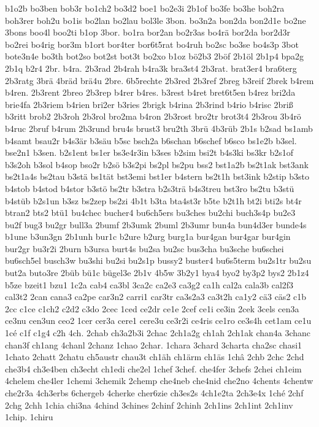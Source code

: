 {b1o2b
bo3ben
bob3r
bo1ch2
bo3d2
boe1
bo2e3i
2b1of
bo3fe
bo3he
boh2ra
boh3rer
boh2u
bo1is
bo2lan
bo2lau
bol3le
3bon.
bo3n2a
bon2da
bon2d1e
bo2ne
3bons
boo4l
boo2ti
b1op
3bor.
bo1ra
bor2an
bo2r3as
bo4rä
bor2da
bor2d3r
bo2rei
bo4rig
bor3m
b1ort
bor4ter
bor6t5rat
bo4ruh
bo2sc
bo3se
bo4s3p
3bot
bote3n4e
bo3th
bot2so
bot2st
bot3t
bo2xo
b1oz
bö2b3
2böf
2b1öl
2b1p4
bpa2g
2b1q
b2r4
2br.
b4ra.
2b3rad
2b4rah
b4ra3k
bra3st4
2b3rat.
brat3er4
bra6terg
2b3ratg
3brä
4bräd
brä4u
2bre.
6b5rechte
2b3red
2b3ref
2breg
b3reif
2brek
b4rem
b4ren.
2b3rent
2breo
2b3rep
b4rer
b4res.
b3rest
b4ret
bret6t5en
b4rez
bri2da
brie4fa
2b3riem
b4rien
bri2er
b3ries
2brigk
b4rina
2b3rind
b4rio
b4risc
2briß
b3ritt
brob2
2b3roh
2b3rol
bro2ma
b4ron
2b3rost
bro2tr
brot3t4
2b3rou
3b4rö
b4ruc
2bruf
b4rum
2b3rund
bru4s
brust3
bru2th
3brü
4b3rüb
2b1s
b2sad
bs1amb
b4samt
bsau2r
b4s3är
b3säu
b5sc
bsch2a
b6schan
b6schef
b6sco
bs1e2b
b3sel.
bse2n1
b3sen.
b2s1ent
bs1er
bs3e4r3in
b3ses
b2sim
bsi2t
b4s3ki
bs3kr
b2s1of
b3s2oh
b3sol
b4sop
bso2r
b2sö
b3s2pi
bs2pl
bs2pu
bss2
bst1a2b
bs2t1ak
bst3ank
bs2t1a4s
bs2tau
b3stä
bs1tät
bst3emi
bst1er
b4stern
bs2t1h
bst3ink
b2stip
b3sto
b4stob
b4stod
b4stor
b3stö
bs2tr
b3stra
b2s3trä
b4s3treu
bst3ro
bs2tu
b3stü
b4stüb
b2s1un
b3sz
bs2zep
bs2zi
4b1t
b3ta
bta4st3r
b5te
b2t1h
bt2i
bti2s
bt4r
btran2
bts2
btü1
bu4chec
bucher4
bu6ch5ers
bu3ches
bu2chi
buch3s4p
bu2e3
bu2f
bug3
bu2gr
bull3a
2bumf
2b3umk
2buml
2b3umr
bun4a
bun4d3er
bunde4s
b1une
b3un3gn
2b1unh
bur1c
b2ure
b2urg
burg1a
bur4gan
bur4gar
bur4gin
bur2gr
bu3r2i
2burn
b3ursa
burt4s
bu2sa
bu2sc
bus3cha
bu3sche
bu6schei
bu6sch5el
busch3w
bu3shi
bu2si
bu2s1p
bussy2
buster4
bu6s5term
bu2s1tr
bu2su
but2a
buto3re
2büb
bü1c
bügel3e
2b1v
4b5w
3b2y1
bya4
byo2
by3p2
bys2
2b1z4
b5ze
bzeit1
bzu1
1c2a
cab4
ca3bl
3ca2c
ca2e3
ca3g2
ca1h
cal2a
cala3b
cal2f3
cal3t2
2can
cana3
ca2pe
car3n2
carri1
car3tr
ca3s2a3
ca3t2h
ca1y2
cä3
cäs2
c1b
2cc
c1ce
c1ch2
c2d2
c3do
2cec
1ced
ce2dr
ce1e
2cef
ce1i
ce3in
2cek
3cels
cen3a
ce3nu
cen3un
ceo2
1cer
cer3a
cere1
cere3u
ce3r2i
ce4ris
ce1ro
ce3s4h
cet1am
ce1u
1cé
c1f
c1g4
c2h
4ch.
2chab
ch3a2b3i
2chac
2ch1a2g
ch1ah
2ch1ak
chan4a
3chanc
chan3f
ch1ang
4chanl
2chanz
1chao
2char.
1chara
3chard
3charta
cha2sc
chasi1
1chato
2chatt
2chatu
ch5austr
chau3t
ch1äh
ch1ärm
ch1äs
1châ
2chb
2chc
2chd
che3b4
ch3e4ben
ch3echt
ch1edi
che2el
1chef
3chef.
che4fer
3chefs
2chei
ch1eim
4chelem
che4ler
1chemi
3chemik
2chemp
che4neb
che4nid
che2no
4chents
4chentw
che2r3a
4ch3erbs
6chergeb
4cherke
cher6zie
ch3es2s
4ch1e2ta
2ch3e4x
1ché
2chf
2chg
2chh
1chia
chi3na
4chind
3chines
2chinf
2chinh
2ch1ins
2ch1int
2ch1inv
1chip.
1chiru
}
